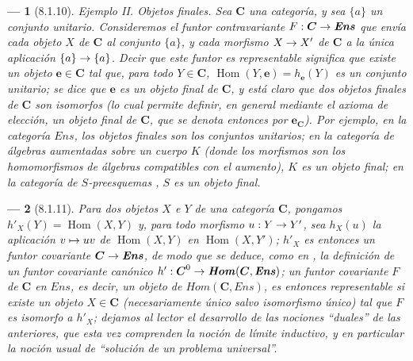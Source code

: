 \documentclass[10pt,oneside,openany]{book}
\makeatletter
\theoremstyle{egaenv}\newtheorem*{env}{---}
\theoremstyle{egastatement}
\theoremstyle{egadescription}
\let\ega@shortmapsto\mapsto
\renewcommand{\to}{\mathchoice{\longrightarrow}{\rightarrow}{\rightarrow}{\rightarrow}}
\renewcommand{\mapsto}{\mathchoice{\longmapsto}{\ega@shortmapsto}{\ega@shortmapsto}{\ega@shortmapsto}}
\makeatother
\begin{document}
\begin{env}[8.1.10]
\label{0.8.1.10}
\label{0.8.1.10-fr}
\textit{Ejemplo II. Objetos finales}.
Sea $\boldsymbol{C}$ una categoría, y sea $\{a\}$ un conjunto unitario.
Consideremos el funtor contravariante $F:\boldsymbol{C}\to\boldsymbol{\mathit{Ens}}$ que envía cada objeto $X$ de $\boldsymbol{C}$ al conjunto $\{a\}$, y cada morfismo $X\to X'$ de $\boldsymbol{C}$ a la única aplicación $\{a\}\to\{a\}$.
Decir que este funtor es \emph{representable} significa que existe un objeto $\boldsymbol{e}\in\boldsymbol{C}$ tal que, para todo $Y\in\boldsymbol{C}$, $\operatorname{Hom}(Y,\boldsymbol{e})=h_{\mathbf{e}}(Y)$ es un \emph{conjunto unitario}; se dice que $\boldsymbol{e}$ es un \emph{objeto final} de $\boldsymbol{C}$, y está claro que dos objetos finales de $\boldsymbol{C}$ son isomorfos (lo cual permite definir, en general mediante el axioma de elección, \emph{un} objeto final de $\boldsymbol{C}$, que se denota entonces por $\boldsymbol{e}_{\mathbf{C}}$).
Por ejemplo, en la categoría $\boldsymbol{\mathit{Ens}}$, los objetos finales son los conjuntos unitarios; en la categoría de \emph{álgebras aumentadas} sobre un cuerpo $K$ (donde los morfismos son los homomorfismos de álgebras compatibles con el aumento), $K$ es un objeto final; en la categoría de \emph{$S$-preesquemas} , $S$ es un objeto final.
\end{env}

\begin{env}[8.1.11]
\label{0.8.1.11}
\label{0.8.1.11-fr}
Para dos objetos $X$ e $Y$ de una categoría $\boldsymbol{C}$, pongamos $h'_X(Y)=\operatorname{Hom}(X,Y)$ y, para todo morfismo $u:Y\to Y'$, sea $h_X(u)$ la aplicación $v\mapsto uv$ de $\operatorname{Hom}(X,Y)$ en $\operatorname{Hom}(X,Y')$; $h'_X$ es entonces un \emph{funtor covariante $\boldsymbol{C}\to\boldsymbol{\mathit{Ens}}$}, de modo que se deduce, como en , la definición de un funtor covariante canónico $h':\boldsymbol{C}^0\to\boldsymbol{\mathit{Hom}}(\boldsymbol{C},\boldsymbol{\mathit{Ens}})$; un funtor \emph{covariante} $F$ de $\boldsymbol{C}$ en $\boldsymbol{\mathit{Ens}}$, es decir, \emph{un} objeto de $\boldsymbol{\mathit{Hom}}(\boldsymbol{C},\boldsymbol{\mathit{Ens}})$, es entonces \emph{representable} si existe un objeto $X\in\boldsymbol{C}$ (necesariamente único salvo isomorfismo único) tal que $F$ es \emph{isomorfo a $h'_X$}; dejamos al lector el desarrollo de las nociones ``duales'' de las anteriores, que esta vez comprenden la noción de \emph{límite inductivo}, y en particular la noción usual de ``solución de un problema universal''.
\end{env}
\end{document}
